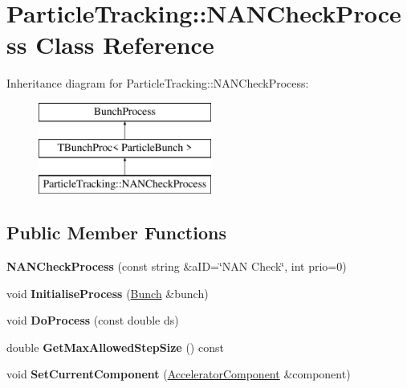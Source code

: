 \hypertarget{classParticleTracking_1_1NANCheckProcess}{}\section{Particle\+Tracking\+:\+:N\+A\+N\+Check\+Process Class Reference}
\label{classParticleTracking_1_1NANCheckProcess}
Inheritance diagram for Particle\+Tracking\+:\+:N\+A\+N\+Check\+Process\+:\begin{figure}[H]
\begin{center}
\leavevmode
\includegraphics[height=3.000000cm]{classParticleTracking_1_1NANCheckProcess}
\end{center}
\end{figure}
\subsection*{Public Member Functions}
\begin{DoxyCompactItemize}
\item 
\mbox{\label{classParticleTracking_1_1NANCheckProcess_a96642dc74facc35b7de6780cdb7c34d4}} 
{\bfseries N\+A\+N\+Check\+Process} (const string \&a\+ID=\char`\"{}N\+AN Check\char`\"{}, int prio=0)
\item 
\mbox{\label{classParticleTracking_1_1NANCheckProcess_a64380a5b8db8634acce4a163562619c4}} 
void {\bfseries Initialise\+Process} (\hyperlink{classBunch}{Bunch} \&bunch)
\item 
\mbox{\label{classParticleTracking_1_1NANCheckProcess_a07e4647804d5c04f7c4c7d0c34bb47b1}} 
void {\bfseries Do\+Process} (const double ds)
\item 
\mbox{\label{classParticleTracking_1_1NANCheckProcess_a081dc3a6d90cf0d9453bcdcd1b80c766}} 
double {\bfseries Get\+Max\+Allowed\+Step\+Size} () const
\item 
\mbox{\label{classParticleTracking_1_1NANCheckProcess_a3b1aaf9c692696843e4c30c754b08db4}} 
void {\bfseries Set\+Current\+Component} (\hyperlink{classAcceleratorComponent}{Accelerator\+Component} \&component)
\end{DoxyCompactItemize}
